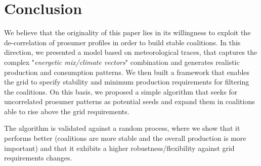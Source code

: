 \documentclass[conference]{IEEEtran}
\begin{document}
\section{Conclusion}
\label{sec: conclusion}

We believe that the originality of this paper lies in its willingness to exploit the de-correlation of prosumer profiles in order to build stable coalitions. In this direction, we presented a model based on meteorological traces, that captures the complex "\textit{energetic mix/climate vectors}" combination and generates realistic production and consumption patterns. We then built a framework that enables the grid to specify stability and minimum production requirements for filtering the coalitions. On this basis, we proposed a simple algorithm that seeks for uncorrelated prosumer patterns as potential seeds and expand them in coalitions able to rise above the grid requirements.

The algorithm is validated against a random process, where we show that it performs better (coalitions are more stable and the overall production is more important) and that it exhibits a higher robustness/flexibility against grid requirements changes.


\end{document}
